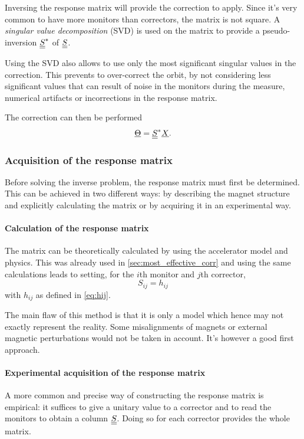 Inversing the response matrix will provide the correction to apply. Since it's very common to have more monitors than correctors, the matrix is not square. A \emph{singular value decomposition} (SVD) is used on the matrix to provide a pseudo-inversion $\underline{\underline{S}}^*$ of $\underline{\underline{S}}$.

Using the SVD also allows to use only the most significant singular values in the correction. This prevents to over-correct the orbit, by not considering less significant values that can result of noise in the monitors during the measure, numerical artifacts or incorrections in the response matrix.

The correction can then be performed
\begin{equation}
\underline{\Theta} = \underline{\underline{S}}^* \underline{X}.
\end{equation}

\subsubsection{Acquisition of the response matrix}
Before solving the inverse problem, the response matrix must first be determined. This can be achieved in two different ways: by describing the magnet structure and explicitly calculating the matrix or by acquiring it in an experimental way.

\paragraph{Calculation of the response matrix}
The matrix can be theoretically calculated by using the accelerator model and physics. This was already used in \cref{sec:most_effective_corr} and using the same calculations leads to setting, for the $i$th monitor and $j$th corrector,
\begin{equation}
S_{ij} = h_{ij}
\end{equation}
with $h_{ij}$ as defined in \cref{eq:hij}.

The main flaw of this method is that it is only a model which hence may not exactly represent the reality. Some misalignments of magnets or external magnetic perturbations would not be taken in account. It's however a good first approach.

\paragraph{Experimental acquisition of the response matrix}
A more common and precise way of constructing the response matrix is empirical: it suffices to give a unitary value to a corrector and to read the monitors to obtain a column $\underline{\underline{S}}$. Doing so for each corrector provides the whole matrix.


